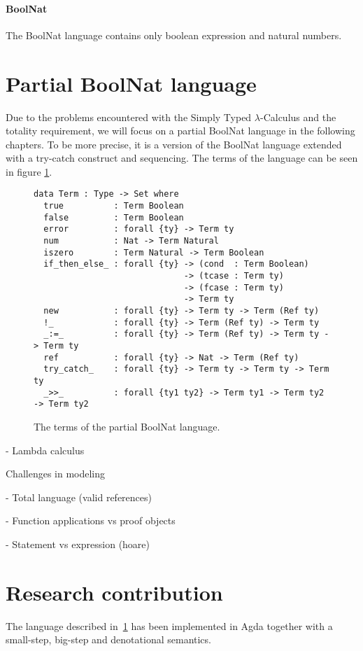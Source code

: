 \documentclass[12pt, a4paper, oneside]{article}
\begin{document}
\paragraph{BoolNat}
The BoolNat language contains only boolean expression and natural numbers.

\section{Partial BoolNat language}
\label{sec:boolnat}

Due to the problems encountered with the Simply Typed $\lambda$-Calculus and the totality requirement, we will focus on a partial BoolNat
language in the following chapters. To be more precise, it is a version of the BoolNat language extended with a try-catch construct and 
sequencing. The terms of the language can be seen in figure \ref{lst:part-boolnat-term}.

\begin{figure}
\begin{lstlisting}
data Term : Type -> Set where
  true          : Term Boolean
  false         : Term Boolean
  error         : forall {ty} -> Term ty 
  num           : Nat -> Term Natural
  iszero        : Term Natural -> Term Boolean
  if_then_else_ : forall {ty} -> (cond  : Term Boolean)
                              -> (tcase : Term ty)
                              -> (fcase : Term ty)
                              -> Term ty
  new           : forall {ty} -> Term ty -> Term (Ref ty)
  !_            : forall {ty} -> Term (Ref ty) -> Term ty
  _:=_          : forall {ty} -> Term (Ref ty) -> Term ty -> Term ty
  ref           : forall {ty} -> Nat -> Term (Ref ty)
  try_catch_    : forall {ty} -> Term ty -> Term ty -> Term ty
  _>>_          : forall {ty1 ty2} -> Term ty1 -> Term ty2 -> Term ty2
\end{lstlisting}
\caption{The terms of the partial BoolNat language.}
\label{lst:part-boolnat-term}
\end{figure}







		- Lambda calculus

		Challenges in modeling

			- Total language (valid references)

			- Function applications vs proof objects

			- Statement vs expression (hoare)


\section{Research contribution}
\label{sec:cont}
The language described in~\ref{sec:boolnat} has been implemented in Agda together with a small-step, big-step and denotational semantics.
\end{document}
